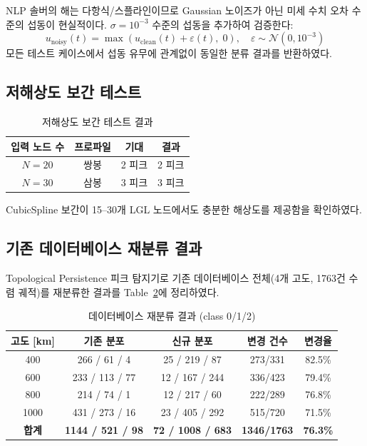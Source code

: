 \documentclass[11pt]{article}
\begin{document}
NLP 솔버의 해는 다항식/스플라인이므로 Gaussian 노이즈가 아닌 미세 수치 오차 수준의 섭동이 현실적이다.
$\sigma = 10^{-3}$ 수준의 섭동을 추가하여 검증한다:
\begin{equation}
  u_{\mathrm{noisy}}(t) = \max\!\left(u_{\mathrm{clean}}(t) + \varepsilon(t),\; 0\right), \quad \varepsilon \sim \mathcal{N}(0, 10^{-3})
  \label{eq:noise}
\end{equation}
모든 테스트 케이스에서 섭동 유무에 관계없이 동일한 분류 결과를 반환하였다.

\subsection{저해상도 보간 테스트}

\begin{table}[h]
\centering
\caption{저해상도 보간 테스트 결과}
\label{tab:lowres}
\begin{tabular}{cccc}
\toprule
입력 노드 수 & 프로파일 & 기대 & 결과 \\
\midrule
$N = 20$ & 쌍봉 & 2 피크 & 2 피크 \\
$N = 30$ & 삼봉 & 3 피크 & 3 피크 \\
\bottomrule
\end{tabular}
\end{table}

CubicSpline 보간이 15--30개 LGL 노드에서도 충분한 해상도를 제공함을 확인하였다.

\subsection{기존 데이터베이스 재분류 결과}

Topological Persistence 피크 탐지기로 기존 데이터베이스 전체(4개 고도, 1763건 수렴 궤적)를 재분류한 결과를 Table~\ref{tab:reclassify}에 정리하였다.

\begin{table}[h]
\centering
\caption{데이터베이스 재분류 결과 (class 0/1/2)}
\label{tab:reclassify}
\begin{tabular}{ccccc}
\toprule
고도 [km] & 기존 분포 & 신규 분포 & 변경 건수 & 변경율 \\
\midrule
400 & 266 / 61 / 4 & 25 / 219 / 87 & 273/331 & 82.5\% \\
600 & 233 / 113 / 77 & 12 / 167 / 244 & 336/423 & 79.4\% \\
800 & 214 / 74 / 1 & 12 / 217 / 60 & 222/289 & 76.8\% \\
1000 & 431 / 273 / 16 & 23 / 405 / 292 & 515/720 & 71.5\% \\
\midrule
\textbf{합계} & \textbf{1144 / 521 / 98} & \textbf{72 / 1008 / 683} & \textbf{1346/1763} & \textbf{76.3\%} \\
\bottomrule
\end{tabular}
\end{table}
\end{document}
